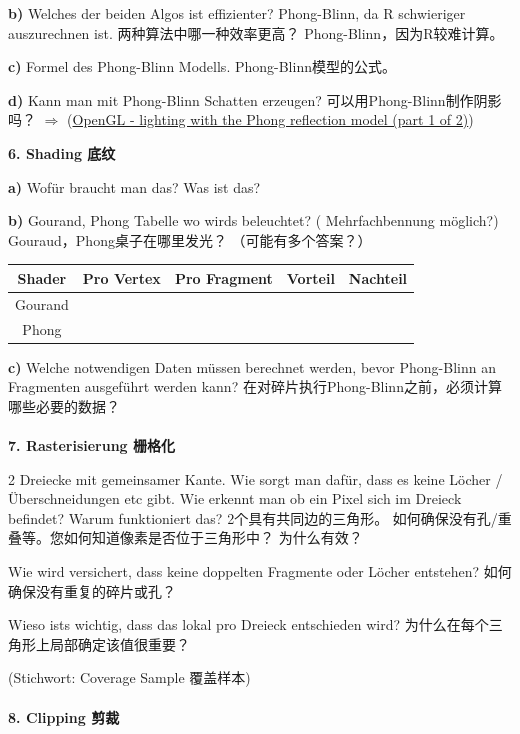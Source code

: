 \documentclass[fleqn]{article}
\begin{document}
\indent\textbf{b)} Welches der beiden Algos ist effizienter? Phong-Blinn, da R schwieriger auszurechnen ist. 两种算法中哪一种效率更高？ Phong-Blinn，因为R较难计算。

\indent\textbf{c)} Formel des Phong-Blinn Modells. Phong-Blinn模型的公式。

\indent\textbf{d)} Kann man mit Phong-Blinn Schatten erzeugen? 可以用Phong-Blinn制作阴影吗？ $\Rightarrow$ (\href{https://youtu.be/lH61rdpJ5v8?t=461 }{OpenGL - lighting with the Phong reflection model (part 1 of 2)})

\noindent\textbf{6. Shading 底纹}

\indent\textbf{a)} Wofür braucht man das? Was ist das?

\indent\textbf{b)} Gourand, Phong Tabelle wo wirds beleuchtet? ( Mehrfachbennung möglich?) Gouraud，Phong桌子在哪里发光？ （可能有多个答案？）

\begin{center}
    \begin{tabular}{|c|c|c|c|c|}
        \hline
        Shader &Pro Vertex&Pro Fragment& Vorteil\qquad\qquad\qquad\qquad&Nachteil\qquad\qquad\qquad\qquad\\
        \hline
        Gourand&&&&\\
        \hline
        Phong&&&&\\
        \hline
    \end{tabular}
\end{center}

\indent\textbf{c)} Welche notwendigen Daten müssen berechnet werden, bevor Phong-Blinn an Fragmenten ausgeführt werden kann? 在对碎片执行Phong-Blinn之前，必须计算哪些必要的数据？
\\
\\
\noindent\textbf{7. Rasterisierung 栅格化}

2 Dreiecke mit gemeinsamer Kante. Wie sorgt man dafür, dass es keine Löcher / Überschneidungen etc gibt. Wie erkennt man ob ein Pixel sich im Dreieck befindet? Warum funktioniert das?
2个具有共同边的三角形。 如何确保没有孔/重叠等。您如何知道像素是否位于三角形中？ 为什么有效？

Wie wird versichert, dass keine doppelten Fragmente oder Löcher entstehen? 如何确保没有重复的碎片或孔？

Wieso ists wichtig, dass das lokal pro Dreieck entschieden wird? 为什么在每个三角形上局部确定该值很重要？

(Stichwort: Coverage Sample 覆盖样本)
\\
\\
\noindent\textbf{8. Clipping 剪裁}
\end{document}
